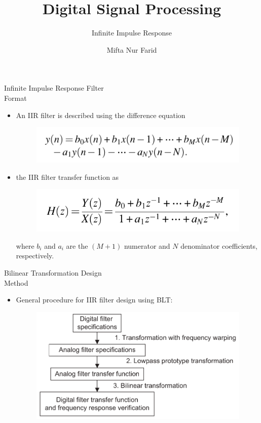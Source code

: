 \documentclass[pdflatex,compress,mathserif]{beamer}
\title{Digital Signal Processing}
\subtitle{Infinite Impulse Response}
\author{Mifta Nur Farid}
\begin{document}
\maketitle

\begin{frame}{Infinite Impulse Response Filter\\Format}
    \begin{itemize}
        \item An IIR filter is described using the difference equation
        \begin{figure}
            \centering
            \includegraphics[width=0.8\linewidth]{./img/img01.png}
        \end{figure}
        \item the IIR filter transfer function as
        \begin{figure}
            \centering
            \includegraphics[width=0.7\linewidth]{./img/img02.png}
        \end{figure}
        where $b_i$ and $a_i$ are the $(M+1)$ numerator and $N$ denominator coefficients, respectively.
    \end{itemize}
\end{frame}

\begin{frame}{Bilinear Transformation Design\\Method}
    \begin{itemize}
        \item General procedure for IIR filter design using BLT:
        \begin{figure}
            \centering
            \includegraphics[width=\linewidth]{./img/img03.png}
        \end{figure}
    \end{itemize}
\end{frame}
\end{document}

